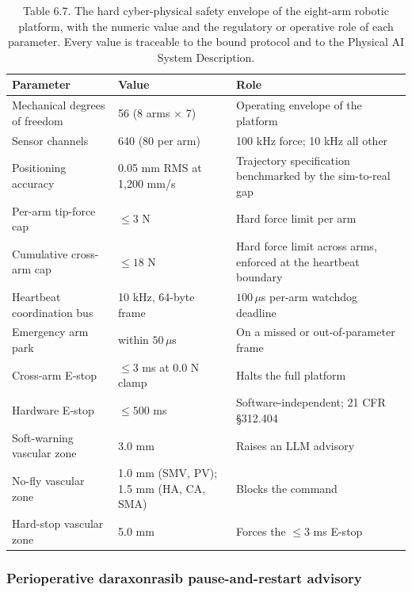 \begin{table}[t]
\caption{Table 6.7. The hard cyber-physical safety envelope of the eight-arm robotic
platform, with the numeric value and the regulatory or operative role of each
parameter. Every value is traceable to the bound protocol and to the Physical AI
System Description.}
\label{tab:sec06-envelope}
\centering
\begin{tabularx}{\textwidth}{L{4.6cm} L{3.4cm} Y}
\toprule
\textbf{Parameter} & \textbf{Value} & \textbf{Role} \\
\midrule
Mechanical degrees of freedom & 56 (8 arms $\times$ 7) & Operating envelope of the platform \\
Sensor channels & 640 (80 per arm) & 100 kHz force; 10 kHz all other \\
Positioning accuracy & 0.05 mm RMS at 1,200 mm/s & Trajectory specification benchmarked by the sim-to-real gap \\
Per-arm tip-force cap & $\leq 3$ N & Hard force limit per arm \\
Cumulative cross-arm cap & $\leq 18$ N & Hard force limit across arms, enforced at the heartbeat boundary \\
Heartbeat coordination bus & 10 kHz, 64-byte frame & $100\,\mu$s per-arm watchdog deadline \\
Emergency arm park & within $50\,\mu$s & On a missed or out-of-parameter frame \\
Cross-arm E-stop & $\leq 3$ ms at 0.0 N clamp & Halts the full platform \\
Hardware E-stop & $\leq 500$ ms & Software-independent; 21 CFR \S 312.404 \\
Soft-warning vascular zone & 3.0 mm & Raises an LLM advisory \\
No-fly vascular zone & 1.0 mm (SMV, PV); 1.5 mm (HA, CA, SMA) & Blocks the command \\
Hard-stop vascular zone & 5.0 mm & Forces the $\leq 3$ ms E-stop \\
\bottomrule
\end{tabularx}
\end{table}

\subsubsection*{Perioperative daraxonrasib pause-and-restart advisory}

